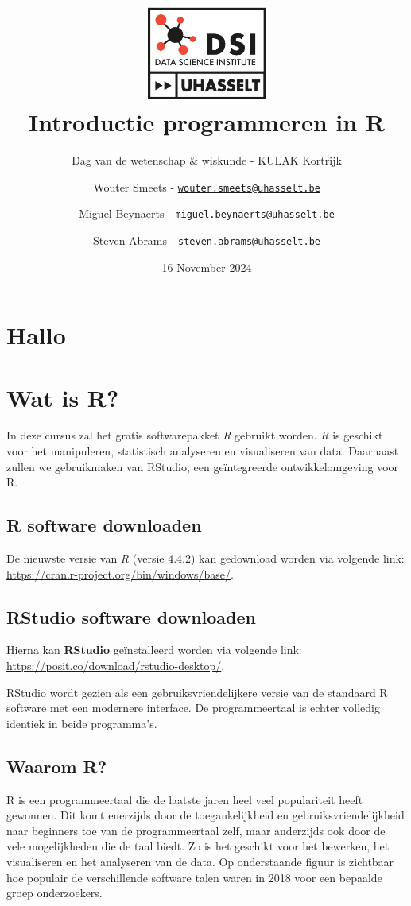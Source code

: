 \documentclass[
]{book}
\title{\includegraphics[width=4cm,height=\textheight]{dsi.png}\\
Introductie programmeren in R}
\subtitle{Dag van de wetenschap \& wiskunde - KULAK Kortrijk}
\author{Wouter Smeets - \href{mailto:wouter.smeets@uhasselt.be}{\nolinkurl{wouter.smeets@uhasselt.be}} \and Miguel Beynaerts - \href{mailto:miguel.beynaerts@uhasselt.be}{\nolinkurl{miguel.beynaerts@uhasselt.be}} \and Steven Abrams - \href{mailto:steven.abrams@uhasselt.be}{\nolinkurl{steven.abrams@uhasselt.be}}}
\date{16 November 2024}
\begin{document}
\maketitle

{
\setcounter{tocdepth}{1}
\tableofcontents
}
\hypertarget{hallo}{%
\chapter{Hallo}\label{hallo}}

\hypertarget{wat-is-r}{%
\chapter{Wat is R?}\label{wat-is-r}}

In deze cursus zal het gratis softwarepakket \emph{R} gebruikt worden. \emph{R} is geschikt voor het manipuleren, statistisch analyseren en visualiseren van data. Daarnaast zullen we gebruikmaken van RStudio, een geïntegreerde ontwikkelomgeving voor R.

\hypertarget{r-software-downloaden}{%
\section{R software downloaden}\label{r-software-downloaden}}

De nieuwste versie van \emph{R} (versie 4.4.2) kan gedownload worden via volgende link:
\url{https://cran.r-project.org/bin/windows/base/}.

\hypertarget{rstudio-software-downloaden}{%
\section{RStudio software downloaden}\label{rstudio-software-downloaden}}

Hierna kan \textbf{RStudio} geïnstalleerd worden via volgende link:
\url{https://posit.co/download/rstudio-desktop/}.

RStudio wordt gezien als een gebruiksvriendelijkere versie van de standaard R
software met een modernere interface. De programmeertaal is echter volledig identiek in
beide programma's.

\hypertarget{waarom-r}{%
\section{Waarom R?}\label{waarom-r}}

R is een programmeertaal die de laatste jaren heel veel populariteit heeft gewonnen. Dit komt enerzijds door de toegankelijkheid en gebruiksvriendelijkheid naar beginners toe van de programmeertaal zelf, maar anderzijds ook door de vele mogelijkheden die de taal biedt. Zo is het geschikt voor het bewerken, het visualiseren en het analyseren van de data. Op onderstaande figuur is zichtbaar hoe populair de verschillende software talen waren in 2018 voor een bepaalde groep onderzoekers.
\end{document}
